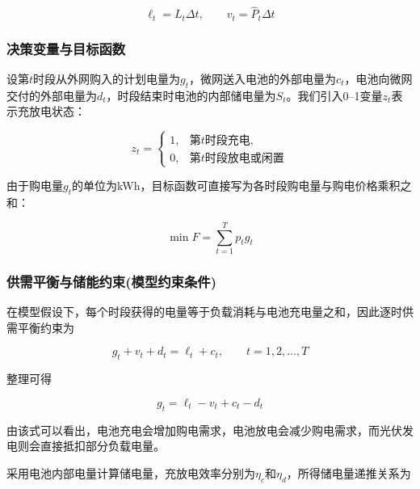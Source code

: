 \documentclass[UTF8]{ctexart}
\begin{document}
    \begin{equation}
        \ell_t=L_t\Delta t,\qquad v_t=\widehat P_t\Delta t
    \end{equation}
    
    \subsubsection{决策变量与目标函数}
    
    设第$t$时段从外网购入的计划电量为$g_t$，微网送入电池的外部电量为$c_t$，电池向微网交付的外部电量为$d_t$，时段结束时电池的内部储电量为$S_t$。我们引入0--1变量$z_t$表示充放电状态：
    
    \begin{equation}
        z_t=
        \begin{cases}
            1, & \text{第$t$时段充电},\\
            0, & \text{第$t$时段放电或闲置}
        \end{cases}
    \end{equation}
    
    由于购电量$g_t$的单位为kWh，目标函数可直接写为各时段购电量与购电价格乘积之和：
    
    \begin{equation}
        \min F=\sum_{t=1}^{T}p_tg_t
    \end{equation}
    
    \subsubsection{供需平衡与储能约束(模型约束条件)}
    
    在模型假设下，每个时段获得的电量等于负载消耗与电池充电量之和，因此逐时供需平衡约束为
    
    \begin{equation}
        g_t+v_t+d_t=\ell_t+c_t,\qquad t=1,2,\ldots,T
    \end{equation}
    
    整理可得
    
    \begin{equation}
        g_t=\ell_t-v_t+c_t-d_t
    \end{equation}
    
    由该式可以看出，电池充电会增加购电需求，电池放电会减少购电需求，而光伏发电则会直接抵扣部分负载电量。\par
    
    采用电池内部电量计算储电量，充放电效率分别为$\eta_c$和$\eta_d$，所得储电量递推关系为
    
\end{document}
